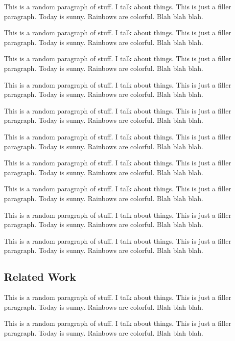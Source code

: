 \documentclass{article}
\begin{document}
		{\color{BurntOrange} This is a random paragraph of stuff. I talk about things. This is just a filler paragraph. Today is sunny. Rainbows are colorful. Blah blah blah.}
		
		{\color{BurntOrange} This is a random paragraph of stuff. I talk about things. This is just a filler paragraph. Today is sunny. Rainbows are colorful. Blah blah blah.}
		
		{\color{BurntOrange} This is a random paragraph of stuff. I talk about things. This is just a filler paragraph. Today is sunny. Rainbows are colorful. Blah blah blah.}
		
		{\color{BurntOrange} This is a random paragraph of stuff. I talk about things. This is just a filler paragraph. Today is sunny. Rainbows are colorful. Blah blah blah.}
		
		{\color{BurntOrange} This is a random paragraph of stuff. I talk about things. This is just a filler paragraph. Today is sunny. Rainbows are colorful. Blah blah blah.}
		
		{\color{BurntOrange} This is a random paragraph of stuff. I talk about things. This is just a filler paragraph. Today is sunny. Rainbows are colorful. Blah blah blah.}
		
		{\color{BurntOrange} This is a random paragraph of stuff. I talk about things. This is just a filler paragraph. Today is sunny. Rainbows are colorful. Blah blah blah.}
		
		{\color{BurntOrange} This is a random paragraph of stuff. I talk about things. This is just a filler paragraph. Today is sunny. Rainbows are colorful. Blah blah blah.}
		
		{\color{BurntOrange} This is a random paragraph of stuff. I talk about things. This is just a filler paragraph. Today is sunny. Rainbows are colorful. Blah blah blah.}
		
		{\color{BurntOrange} This is a random paragraph of stuff. I talk about things. This is just a filler paragraph. Today is sunny. Rainbows are colorful. Blah blah blah.}
		
	\subsection{Related Work}
	
		{\color{BurntOrange} This is a random paragraph of stuff. I talk about things. This is just a filler paragraph. Today is sunny. Rainbows are colorful. Blah blah blah.}
		
		{\color{BurntOrange} This is a random paragraph of stuff. I talk about things. This is just a filler paragraph. Today is sunny. Rainbows are colorful. Blah blah blah.}
		
\end{document}
